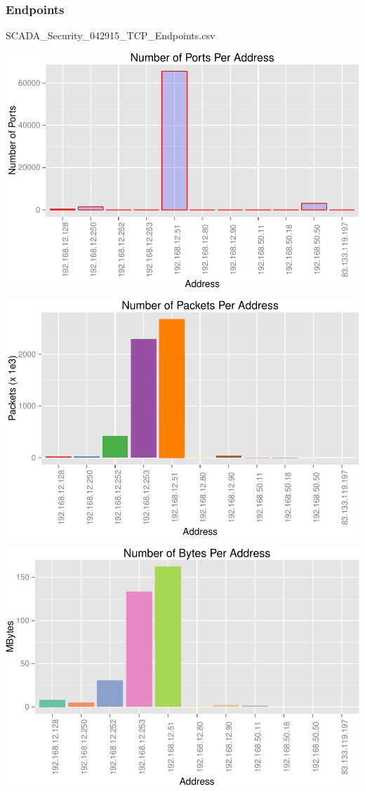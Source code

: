 \documentclass[]{article}
\begin{document}
\subsubsection{Endpoints}\label{endpoints}

SCADA\_Security\_042915\_TCP\_Endpoints.csv

\includegraphics{edaReport_files/figure-latex/unnamed-chunk-17-1.pdf}

\includegraphics{edaReport_files/figure-latex/unnamed-chunk-18-1.pdf}

\includegraphics{edaReport_files/figure-latex/unnamed-chunk-19-1.pdf}
\end{document}
